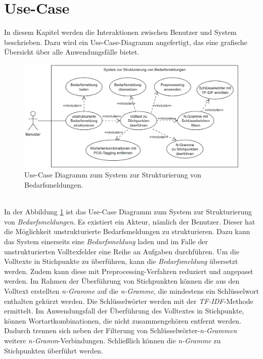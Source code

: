 \section{Use-Case}
\label{sec:usecase}
In diesem Kapitel werden die Interaktionen zwischen Benutzer und System beschrieben. Dazu wird ein Use-Case-Diagramm angefertigt, das eine grafische Übersicht über alle Anwendungsfälle bietet.
\begin{figure}[H]
	\centering  
	\includegraphics[width=\linewidth]{Abbildungen/use-case.png}
	\caption{Use-Case Diagramm zum System zur Strukturierung von Bedarfsmeldungen.}
	\label{fig:usecasediagrammwirklich}
\end{figure}\mbox{} \\
In der Abbildung \ref{fig:usecasediagrammwirklich} ist das Use-Case Diagramm zum System zur Strukturierung von \emph{Bedarfsmeldungen}. Es existiert ein Akteur, nämlich der Benutzer. Dieser hat die Möglichkeit unstrukturierte Bedarfsmeldungen zu strukturieren. Dazu kann das System einerseits eine \emph{Bedarfsmeldung} laden und im Falle der unstrukturierten Volltexfelder eine Reihe an Aufgaben durchführen. Um die Volltexte in Stichpunkte zu überführen, kann die \emph{Bedarfsmeldung} übersetzt werden. Zudem kann diese mit Preprocessing-Verfahren reduziert und angepasst werden. Im Rahmen der Überführung von Stichpunkten können die aus den Volltext erstellten \emph{n-Gramme} auf die \emph{n-Gramme}, die mindestens ein Schlüsselwort enthalten gekürzt werden. Die Schlüsselwörter werden mit der \emph{TF-IDF}-Methode ermittelt. Im Anwendungsfall der Überführung des Volltextes in Stichpunkte, können Wortartkombinationen, die nicht zusammengehören entfernt werden. Dadurch trennen sich neben der Filterung von Schlüsselwörter-\emph{n-Grammen} weitere \emph{n-Gramm}-Verbindungen. Schließlich können die \emph{n-Gramme} zu Stichpunkten überführt werden.
